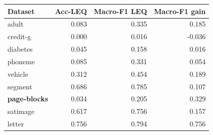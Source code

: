 \begin{tabular}{lrrr}
\toprule
Dataset & Acc-LEQ & Macro-F1 LEQ & Macro-F1 gain \\
\midrule
adult & 0.083 & 0.335 & 0.185 \\
credit-g & 0.000 & 0.016 & -0.036 \\
diabetes & 0.045 & 0.158 & 0.016 \\
phoneme & 0.085 & 0.331 & 0.054 \\
vehicle & 0.312 & 0.454 & 0.189 \\
segment & 0.686 & 0.785 & 0.107 \\
\textbf{page-blocks} & 0.034 & 0.205 & 0.329 \\
satimage & 0.617 & 0.756 & 0.157 \\
letter & 0.756 & 0.794 & 0.756 \\
\bottomrule
\end{tabular}
